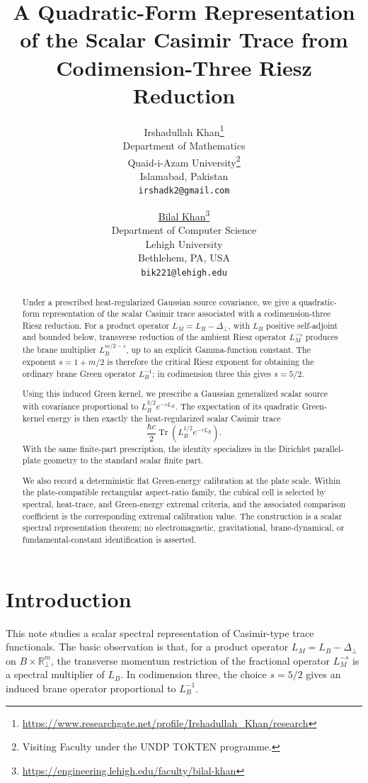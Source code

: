 \documentclass[11pt]{article}
\title{A Quadratic-Form Representation of the Scalar Casimir Trace
from Codimension-Three Riesz Reduction}
\author{
Irshadullah Khan\thanks{\url{https://www.researchgate.net/profile/Irshadullah_Khan/research}}\\
Department of Mathematics\\
Quaid-i-Azam University\thanks{Visiting Faculty under the UNDP TOKTEN programme.}\\
Islamabad, Pakistan\\
\texttt{irshadk2@gmail.com}
\and
\href{https://orcid.org/0000-0001-8823-6752}{Bilal Khan}\thanks{\url{https://engineering.lehigh.edu/faculty/bilal-khan}}\\
Department of Computer Science\\
Lehigh University\\
Bethlehem, PA, USA\\
\texttt{bik221@lehigh.edu}
}
\date{}
\newcommand{\R}{\mathbb{R}}
\begin{document}
\maketitle

\begin{abstract}
Under a prescribed heat-regularized Gaussian source covariance, we give a
quadratic-form representation of the scalar Casimir trace associated with a
codimension-three Riesz reduction.  For a product operator
\(L_M=L_B-\Delta_\perp\), with \(L_B\) positive self-adjoint and bounded
below, transverse reduction of the ambient Riesz operator \(L_M^{-s}\)
produces the brane multiplier \(L_B^{m/2-s}\), up to an explicit
Gamma-function constant.  The exponent \(s=1+m/2\) is therefore the critical
Riesz exponent for obtaining the ordinary brane Green operator \(L_B^{-1}\);
in codimension three this gives \(s=5/2\).

Using this induced Green kernel, we prescribe a Gaussian generalized scalar
source with covariance proportional to \(L_B^{3/2}e^{-\tau L_B}\).  The
expectation of its quadratic Green-kernel energy is then exactly the
heat-regularized scalar Casimir trace
\[
    \frac{\hbar c}{2}
    \operatorname{Tr}\!\left(L_B^{1/2}e^{-\tau L_B}\right).
\]
With the same finite-part prescription, the identity specializes in the
Dirichlet parallel-plate geometry to the standard scalar finite part.

We also record a deterministic flat Green-energy calibration at the plate
scale.  Within the plate-compatible rectangular aspect-ratio family, the
cubical cell is selected by spectral, heat-trace, and Green-energy extremal
criteria, and the associated comparison coefficient is the corresponding
extremal calibration value.  The construction is a scalar spectral
representation theorem; no electromagnetic, gravitational, brane-dynamical,
or fundamental-constant identification is asserted.
\end{abstract}

\section{Introduction}

This note studies a scalar spectral representation of Casimir-type trace
functionals.  The basic observation is that, for a product operator
\(L_M=L_B-\Delta_\perp\) on \(B\times\R^m_\perp\), the transverse momentum
restriction of the fractional operator \(L_M^{-s}\) is a spectral multiplier
of \(L_B\).  In codimension three, the choice \(s=5/2\) gives an induced
brane operator proportional to \(L_B^{-1}\).
\end{document}
